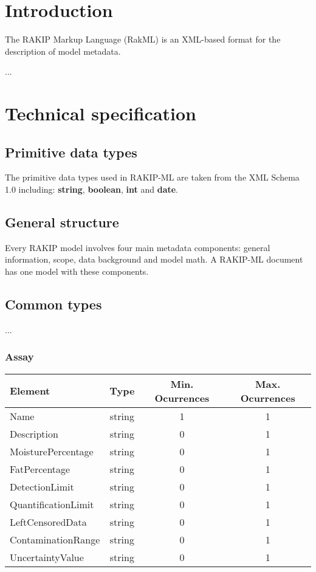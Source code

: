 \documentclass[a4paper]{report}
\newcommand{\booleantype}{\textbf{boolean}}
\newcommand{\stringtype}{\textbf{string}}
\begin{document}
\chapter{Introduction}

The RAKIP Markup Language (RakML) is an XML-based format for the description of model metadata.

...

\chapter{Technical specification}

\section{Primitive data types}
The primitive data types used in RAKIP-ML are taken from the XML Schema 1.0 including: \stringtype, \booleantype, \textbf{int} and \textbf{date}.

\section{General structure}
Every RAKIP model involves four main metadata components: general information, scope, data background and model math. A RAKIP-ML document has one model with these components.

\section{Common types}
...

\subsection{Assay}

\begin{tabular}{|l|c|c|c|}
    \hline
    \textbf{Element} & \textbf{Type} & \textbf{Min. Ocurrences} & \textbf{Max. Ocurrences} \\
    \hline
    Name & string & 1 & 1 \\
    Description & string & 0 & 1 \\
    MoisturePercentage & string & 0 & 1 \\
    FatPercentage & string & 0 & 1 \\
    DetectionLimit & string & 0 & 1 \\
    QuantificationLimit & string & 0 & 1 \\
    LeftCensoredData & string & 0 & 1 \\
    ContaminationRange & string & 0 & 1 \\
    UncertaintyValue & string & 0 & 1 \\
    \hline
\end{tabular}
\end{document}
